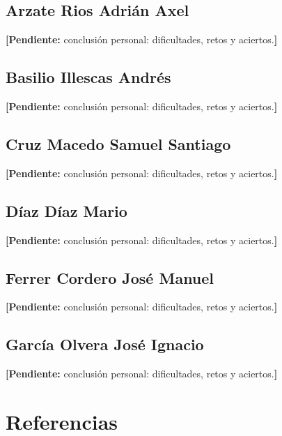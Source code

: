 \documentclass[12pt,a4paper]{article}
\newcommand{\pendiente}[1]{{\color{pend}\textbf{[Pendiente:} #1\textbf{]}}}
\begin{document}
\subsection*{Arzate Rios Adrián Axel}
\pendiente{conclusión personal: dificultades, retos y aciertos.}

\subsection*{Basilio Illescas Andrés}
\pendiente{conclusión personal: dificultades, retos y aciertos.}

\subsection*{Cruz Macedo Samuel Santiago}
\pendiente{conclusión personal: dificultades, retos y aciertos.}

\subsection*{Díaz Díaz Mario}
\pendiente{conclusión personal: dificultades, retos y aciertos.}

\subsection*{Ferrer Cordero José Manuel}
\pendiente{conclusión personal: dificultades, retos y aciertos.}

\subsection*{García Olvera José Ignacio}
\pendiente{conclusión personal: dificultades, retos y aciertos.}

\section*{Referencias}
\sloppy
\end{document}
